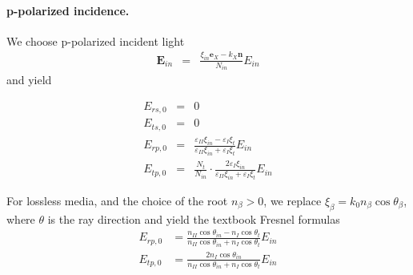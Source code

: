 \documentclass[12pt,a4paper,twoside,openright,BCOR10mm,headsepline,titlepage,abstracton,chapterprefix,final]{scrreprt}
\newcommand\Vector[1]{{\mathbf{#1}}}
\newcommand\wavenumber{k}
\newcommand\scalarEfield{E}
\newcommand\Efield{\Vector{\scalarEfield}}
\newcommand\scalarpermittivity{\varepsilon}
\newcommand\materialone{I}
\newcommand\materialtwo{{II}}
\newcommand\ppol{p}
\newcommand\spol{s}
\newcommand\normconst{N}
\begin{document}
\paragraph{p-polarized incidence.}
We choose p-polarized incident light 
\begin{eqnarray}
\Efield_{in} &=& \frac{\xi_{in} \Vector{e}_X - \wavenumber_X \Vector{n}}{\normconst_{in}} E_{in} 
\end{eqnarray}
and yield

\begin{subequations}
\begin{eqnarray}
    E_{r \spol,0} &=& 0 \\ 
    E_{t \spol,0} &=& 0 \\
    E_{r \ppol,0} 
    &=&
    \frac{
      \scalarpermittivity_\materialtwo \xi_{in} 
      -
      \scalarpermittivity_\materialone \xi_t
    }
    {
      \scalarpermittivity_\materialtwo \xi_{in}
      +
      \scalarpermittivity_\materialone \xi_t 
    }
    E_{in} 
  \\
    E_{t \ppol,0} 
    &=& 
    \frac{\normconst_t}{\normconst_{in}}
    \cdot
    \frac{
      2 \scalarpermittivity_\materialone \xi_{in}
    }
    {
      \scalarpermittivity_\materialtwo \xi_{in}
      +
      \scalarpermittivity_\materialone \xi_t 
    }
    E_{in} 
\end{eqnarray}
\end{subequations}


For lossless media, and the choice of the root $n_\beta > 0$, 
we replace $\xi_\beta = \wavenumber_0 n_\beta \cos \theta_\beta$, where $\theta$ is the ray direction
and yield the textbook Fresnel formulas \cite{Jackson, BornWolf}
\begin{subequations}
  \begin{align}
    E_{r \ppol,0} &= \frac{ n_\materialtwo \cos \theta_{in} - n_\materialone \cos \theta_t }
                          { n_\materialtwo \cos \theta_{in} + n_\materialone \cos \theta_t } E_{in}
  \\
    E_{t \ppol,0} &= \frac{ 2 n_\materialone \cos \theta_{in} }
                          {   n_\materialtwo \cos \theta_{in} + n_\materialone \cos \theta_t } E_{in}
  \end{align}
\end{subequations}
\end{document}
